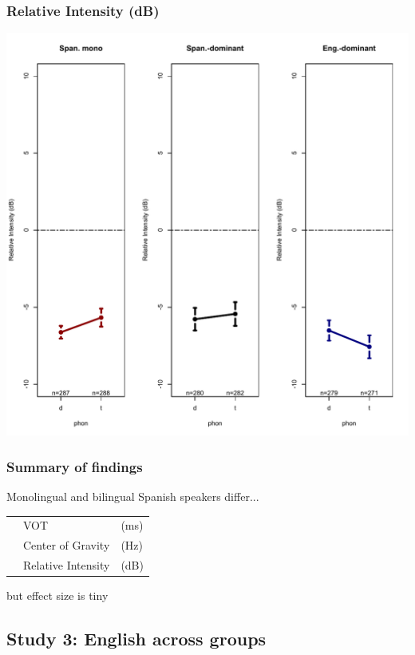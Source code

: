 \documentclass{beamer}
\newcommand{\cmark}{\ding{51}}%
\newcommand{\xmark}{\ding{55}}%
\begin{document}
\begin{frame}
\frametitle{Relative Intensity (dB)}
\begin{center}
\includegraphics[scale=.375]{simplified/fig06_rispanish.pdf}
\end{center}
\end{frame}

\begin{frame}
\frametitle{Summary of findings}
Monolingual and bilingual Spanish speakers differ...
\begin{center}
\begin{tabular}{l l l}
\xmark & VOT & (ms) \\
\cmark & Center of Gravity & (Hz) \\
\xmark & Relative Intensity & (dB) \\
\end{tabular}
\end{center}
but effect size is tiny
\end{frame}

\subsection{Study 3: English  across groups}

\end{document}
